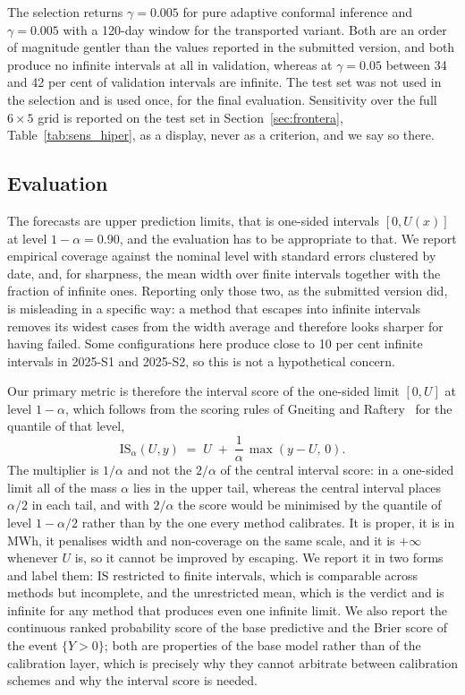 \documentclass[preprint,3p,times]{elsarticle}
\begin{document}
The selection returns $\gamma=0.005$ for pure adaptive conformal inference and $\gamma=0.005$ with a 120-day window for the transported variant. Both are an order of magnitude gentler than the values reported in the submitted version, and both produce no infinite intervals at all in validation, whereas at $\gamma=0.05$ between 34 and 42 per cent of validation intervals are infinite. The test set was not used in the selection and is used once, for the final evaluation. Sensitivity over the full $6\times5$ grid is reported on the test set in Section~\ref{sec:frontera}, Table~\ref{tab:sens_hiper}, as a display, never as a criterion, and we say so there.

\subsection{Evaluation}
\label{sec:evaluacion}

The forecasts are upper prediction limits, that is one-sided intervals $[0,U(x)]$ at level $1-\alpha=0.90$, and the evaluation has to be appropriate to that. We report empirical coverage against the nominal level with standard errors clustered by date, and, for sharpness, the mean width over finite intervals together with the fraction of infinite ones. Reporting only those two, as the submitted version did, is misleading in a specific way: a method that escapes into infinite intervals removes its widest cases from the width average and therefore looks sharper for having failed. Some configurations here produce close to 10 per cent infinite intervals in 2025-S1 and 2025-S2, so this is not a hypothetical concern.

Our primary metric is therefore the interval score of the one-sided limit $[0,U]$ at level $1-\alpha$, which follows from the scoring rules of Gneiting and Raftery~\cite{gneiting2007} for the quantile of that level,
\begin{equation}
\mathrm{IS}_\alpha(U,y) \;=\; U \;+\; \frac{1}{\alpha}\,\max(y-U,\,0).
\label{eq:is}
\end{equation}
The multiplier is $1/\alpha$ and not the $2/\alpha$ of the central interval score: in a one-sided limit all of the mass $\alpha$ lies in the upper tail, whereas the central interval places $\alpha/2$ in each tail, and with $2/\alpha$ the score would be minimised by the quantile of level $1-\alpha/2$ rather than by the one every method calibrates. It is proper, it is in MWh, it penalises width and non-coverage on the same scale, and it is $+\infty$ whenever $U$ is, so it cannot be improved by escaping. We report it in two forms and label them: $\mathrm{IS}$ restricted to finite intervals, which is comparable across methods but incomplete, and the unrestricted mean, which is the verdict and is infinite for any method that produces even one infinite limit. We also report the continuous ranked probability score of the base predictive and the Brier score of the event $\{Y>0\}$; both are properties of the base model rather than of the calibration layer, which is precisely why they cannot arbitrate between calibration schemes and why the interval score is needed.
\end{document}
